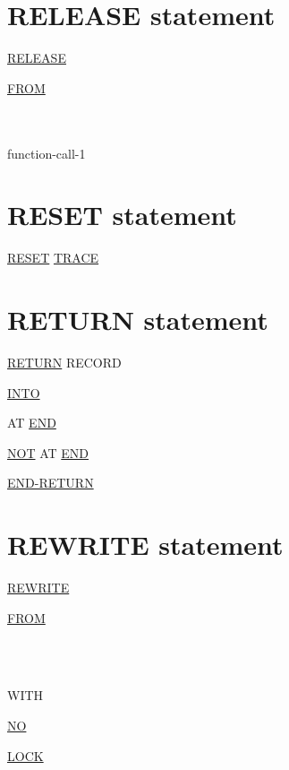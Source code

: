 \documentclass[a4paper,oneside,svgnames]{scrbook}
\makeatletter
\newcommand{\key}[1]{\underline{#1}}
\newcommand{\miscext}[1]{%
  \colorbox{blue!50}{#1}}
\newenvironment{0-1}{$\left[ \begin{tabular}{@{}l@{}}}{\end{tabular} \right]$}
\newenvironment{1=}{$\left\{ \begin{tabular}{@{}l@{}}}{\end{tabular} \right\}$}
\makeatother
\begin{document}
\section{RELEASE statement}

\key{RELEASE} \identifier
\begin{0-1}
  \key{FROM}
  \begin{1=}
    \identifier \\
    \literal \\
    function-call-1
  \end{1=}
\end{0-1}

\section{RESET statement}

\miscext{\key{RESET} \key{TRACE}}

\section{RETURN statement}

\key{RETURN} \filename RECORD
\begin{0-1}
  \key{INTO} \identifier
\end{0-1}

AT \key{END} \imperativestatement

\begin{0-1}
  \key{NOT} AT \key{END} \imperativestatement
\end{0-1}

\begin{0-1}
  \key{END-RETURN}
\end{0-1}

\section{REWRITE statement}

\key{REWRITE}
\recordname
\begin{0-1}
  \key{FROM}
  \begin{1=}
    \identifier \\
    \literal \\
    \functionname
  \end{1=}
\end{0-1}
\begin{0-1}
  WITH
  \begin{0-1}
    \key{NO}
  \end{0-1}
  \key{LOCK}
\end{0-1}
\end{document}

